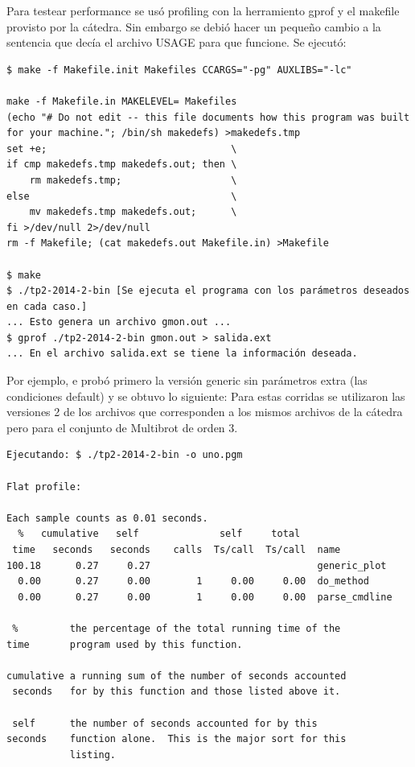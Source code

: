 \documentclass[a4paper,10pt]{article}
\begin{document}
Para testear performance se usó profiling con la herramiento gprof y el makefile provisto por la cátedra. Sin embargo se debió hacer un pequeño cambio a la sentencia que decía el archivo USAGE para que funcione.
Se ejecutó:
\begin{verbatim}
$ make -f Makefile.init Makefiles CCARGS="-pg" AUXLIBS="-lc"

make -f Makefile.in MAKELEVEL= Makefiles
(echo "# Do not edit -- this file documents how this program was built for your machine."; /bin/sh makedefs) >makedefs.tmp
set +e;                                \
if cmp makedefs.tmp makedefs.out; then \
    rm makedefs.tmp;                   \
else                                   \
    mv makedefs.tmp makedefs.out;      \
fi >/dev/null 2>/dev/null
rm -f Makefile; (cat makedefs.out Makefile.in) >Makefile

$ make
$ ./tp2-2014-2-bin [Se ejecuta el programa con los parámetros deseados en cada caso.]
... Esto genera un archivo gmon.out ...
$ gprof ./tp2-2014-2-bin gmon.out > salida.ext
... En el archivo salida.ext se tiene la información deseada.
\end{verbatim}



Por ejemplo, e probó primero la versión generic sin parámetros extra (las condiciones default) y se obtuvo lo siguiente:
Para estas corridas se utilizaron las versiones 2 de los archivos que corresponden a los mismos archivos de la cátedra pero para el conjunto de Multibrot de orden 3.

\begin{verbatim}
Ejecutando: $ ./tp2-2014-2-bin -o uno.pgm

Flat profile:

Each sample counts as 0.01 seconds.
  %   cumulative   self              self     total
 time   seconds   seconds    calls  Ts/call  Ts/call  name
100.18      0.27     0.27                             generic_plot
  0.00      0.27     0.00        1     0.00     0.00  do_method
  0.00      0.27     0.00        1     0.00     0.00  parse_cmdline

 %         the percentage of the total running time of the
time       program used by this function.

cumulative a running sum of the number of seconds accounted
 seconds   for by this function and those listed above it.

 self      the number of seconds accounted for by this
seconds    function alone.  This is the major sort for this
           listing.
\end{verbatim}
\end{document}
